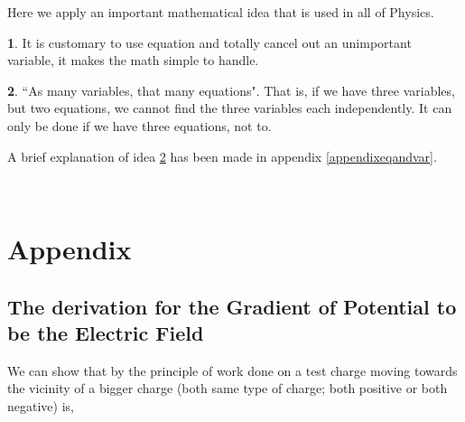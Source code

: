 \documentclass[11pt,a4paper,twocolumn,openright]{article}
\theoremstyle{definition}
\theoremstyle{definition}
\theoremstyle{definition}
\newtheorem{idea}{ \framebox[0.05\textwidth]{{\sffamily Idea}} }
\theoremstyle{definition}
\begin{document}
Here we apply an important mathematical idea that is used in all of Physics.

\begin{idea}
It is customary to use equation and totally cancel out an unimportant variable, it makes the math simple to handle. 
\end{idea}
\begin{idea} \label{ideaeqandvar}
``As many variables, that many equations". That is, if we have three variables, but two equations, we cannot find the three variables each independently. It can only be done if we have three equations, not to.
\end{idea}
A brief explanation of idea \ref{ideaeqandvar} has been made in appendix \ref{appendixeqandvar}.















































\newpage
\
\newpage

\section{\small{Appendix}}
\subsection{{\small The derivation for the Gradient of Potential to be the Electric Field}}
We can show that by the principle of work done on a test charge moving towards the vicinity of a bigger charge (both same type of charge; both positive or both negative) is,
\end{document}
